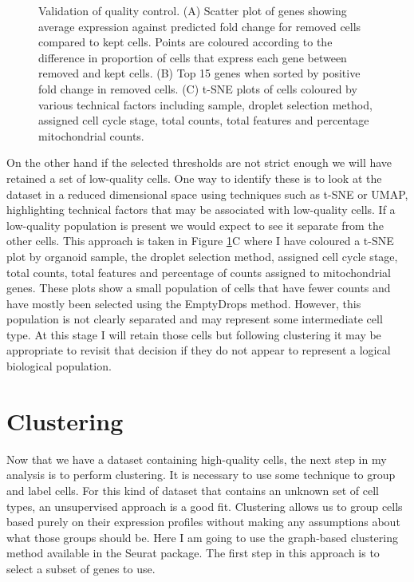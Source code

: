 \documentclass[11pt,a4paper,titlepage,twoside,openright]{style/unimelbthesis}
\theoremstyle{definition}
\theoremstyle{definition}
\theoremstyle{definition}
\theoremstyle{remark}
\begin{document}
\begin{mainmatter}
\begin{figure}
{}

\caption[Validation of quality control.]{Validation of quality control. (A) Scatter plot of genes showing average expression against predicted fold change for removed cells compared to kept cells. Points are coloured according to the difference in proportion of cells that express each gene between removed and kept cells. (B) Top 15 genes when sorted by positive fold change in removed cells. (C) t-SNE plots of cells coloured by various technical factors including sample, droplet selection method, assigned cell cycle stage, total counts, total features and percentage mitochondrial counts.}\label{fig:qc-validation}
\end{figure}





On the other hand if the selected thresholds are not strict enough we will have retained a set of low-quality cells. One way to identify these is to look at the dataset in a reduced dimensional space using techniques such as t-SNE or UMAP, highlighting technical factors that may be associated with low-quality cells. If a low-quality population is present we would expect to see it separate from the other cells. This approach is taken in Figure \ref{fig:qc-validation}C where I have coloured a t-SNE plot by organoid sample, the droplet selection method, assigned cell cycle stage, total counts, total features and percentage of counts assigned to mitochondrial genes. These plots show a small population of cells that have fewer counts and have mostly been selected using the EmptyDrops method. However, this population is not clearly separated and may represent some intermediate cell type. At this stage I will retain those cells but following clustering it may be appropriate to revisit that decision if they do not appear to represent a logical biological population.

\hypertarget{clustering}{%
\section{Clustering}\label{clustering}}

Now that we have a dataset containing high-quality cells, the next step in my analysis is to perform clustering. It is necessary to use some technique to group and label cells. For this kind of dataset that contains an unknown set of cell types, an unsupervised approach is a good fit. Clustering allows us to group cells based purely on their expression profiles without making any assumptions about what those groups should be. Here I am going to use the graph-based clustering method available in the Seurat package. The first step in this approach is to select a subset of genes to use.


\end{mainmatter}
\end{document}
